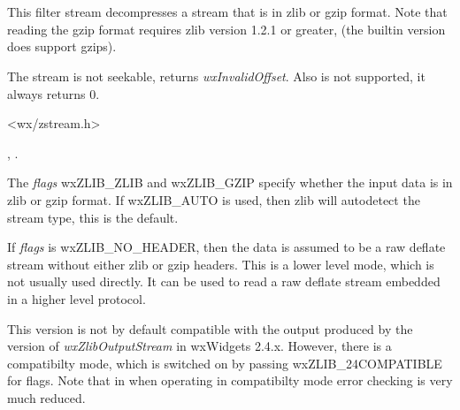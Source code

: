 \section{}\label{wxzlibinputstream}

This filter stream decompresses a stream that is in zlib or gzip format.
Note that reading the gzip format requires zlib version 1.2.1 or greater,
(the builtin version does support gzips).

The stream is not seekable,  returns
 {\it wxInvalidOffset}. Also  is
not supported, it always returns $0$.




<wx/zstream.h>


, 
 .




The {\it flags} wxZLIB\_ZLIB and wxZLIB\_GZIP specify whether the input data
is in zlib or gzip format. If wxZLIB\_AUTO is used, then zlib will
autodetect the stream type, this is the default.

If {\it flags} is wxZLIB\_NO\_HEADER, then the data is assumed to be a raw
deflate stream without either zlib or gzip headers. This is a lower level
mode, which is not usually used directly. It can be used to read a raw
deflate stream embedded in a higher level protocol.

This version is not by default compatible with the output produced by
the version of {\it wxZlibOutputStream} in wxWidgets 2.4.x. However,
there is a compatibilty mode, which is switched on by passing
wxZLIB\_24COMPATIBLE for flags. Note that in when operating in compatibilty
mode error checking is very much reduced.

